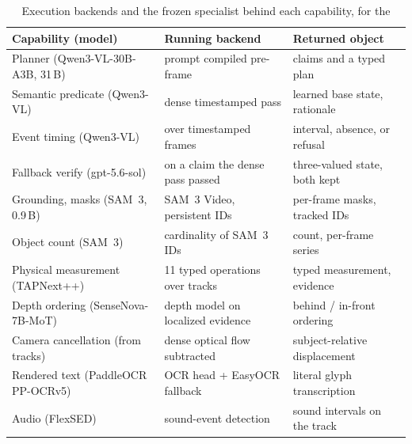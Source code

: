 
\begin{table}[t]
\centering\small
\setlength{\tabcolsep}{5pt}
\renewcommand{\arraystretch}{1.25}
\begin{tabularx}{\textwidth}{@{}p{6.35cm} X X@{}}
\toprule
\textbf{Capability (model)} & \textbf{Running backend} & \textbf{Returned object} \\
\midrule
Planner (Qwen3-VL-30B-A3B, 31\,B)~\cite{qwen3vl2025}
  & prompt compiled pre-frame & claims and a typed plan \\
Semantic predicate (Qwen3-VL)
  & dense timestamped pass & learned base state, rationale \\
Event timing (Qwen3-VL)
  & over timestamped frames & interval, absence, or refusal \\
Fallback verify (gpt-5.6-sol)
  & on a claim the dense pass passed & three-valued state, both kept \\
Grounding, masks (SAM~3, 0.9\,B)~\cite{sam3_2025}
  & SAM~3 Video, persistent IDs & per-frame masks, tracked IDs \\
Object count (SAM~3)
  & cardinality of SAM~3 IDs & count, per-frame series \\
Physical measurement (TAPNext++)~\cite{tapnext2025}
  & 11 typed operations over tracks & typed measurement, evidence \\
Depth ordering (SenseNova-7B-MoT)
  & depth model on localized evidence & behind / in-front ordering \\
Camera cancellation (from tracks)
  & dense optical flow subtracted & subject-relative displacement \\
Rendered text (PaddleOCR PP-OCRv5)
  & OCR head + EasyOCR fallback & literal glyph transcription \\
Audio (FlexSED)~\cite{flexsed2025}
  & sound-event detection & sound intervals on the track \\
\bottomrule
\end{tabularx}
\caption{Execution backends and the frozen specialist behind each capability, for the
}
\end{table}
